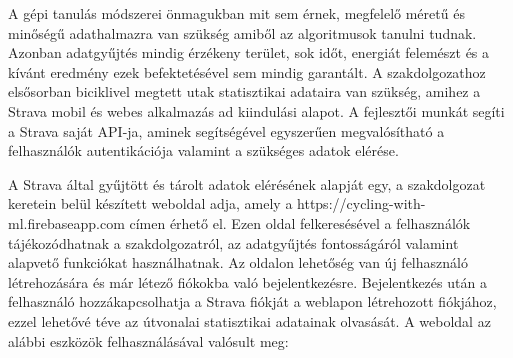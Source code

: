 

A gépi tanulás módszerei önmagukban mit sem érnek, megfelelő méretű és minőségű adathalmazra van szükség amiből az algoritmusok tanulni tudnak. Azonban adatgyűjtés mindig érzékeny terület, sok időt, energiát felemészt és a kívánt eredmény ezek befektetésével sem mindig garantált. A szakdolgozathoz elsősorban biciklivel megtett utak statisztikai adataira van szükség, amihez a Strava mobil és webes alkalmazás ad kiindulási alapot. A fejlesztői munkát segíti a Strava saját API-ja, aminek segítségével egyszerűen megvalósítható a felhasználók autentikációja valamint a szükséges adatok elérése. 

A Strava által gyűjtött és tárolt adatok elérésének alapját egy, a szakdolgozat keretein belül készített weboldal adja, amely a https://cycling-with-ml.firebaseapp.com címen érhető el. Ezen oldal felkeresésével a felhasználók tájékozódhatnak a szakdolgozatról, az adatgyűjtés fontosságáról valamint alapvető funkciókat használhatnak. Az oldalon lehetőség van új felhasználó létrehozására és már létező fiókokba való bejelentkezésre. Bejelentkezés után a felhasználó hozzákapcsolhatja a Strava fiókját a weblapon létrehozott fiókjához, ezzel lehetővé téve az útvonalai statisztikai adatainak olvasását. A weboldal az alábbi eszközök felhasználásával valósult meg:

